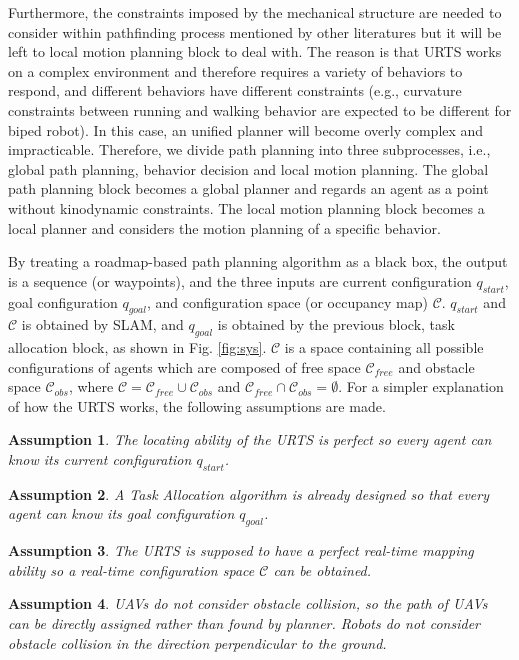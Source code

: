 \documentclass[journal,12pt,onecolumn,draftclsnofoot,]{IEEEtran}
\newtheorem{assumption}{Assumption}[section]
\begin{document}
Furthermore, the constraints imposed by the mechanical structure are needed to consider within pathfinding process mentioned by other literatures but it will be left to local motion planning block to deal with. The reason is that URTS works on a complex environment and therefore requires a variety of behaviors to respond, and different behaviors have different constraints (e.g., curvature constraints between running and walking behavior are expected to be different for biped robot). In this case, an unified planner will become overly complex and impracticable. Therefore, we divide path planning into three subprocesses, i.e., global path planning, behavior decision and local motion planning. The global path planning block becomes a global planner and regards an agent as a point without kinodynamic constraints. The local motion planning block becomes a local planner and considers the motion planning of a specific behavior.

By treating a roadmap-based path planning algorithm as a black box, the output is a sequence (or waypoints), and the three inputs are current configuration $q_{start}$, goal configuration $q_{goal}$, and configuration space (or occupancy map) $\mathcal{C}$. $q_{start}$ and $\mathcal{C}$ is obtained by SLAM, and $q_{goal}$ is obtained by the previous block, task allocation block, as shown in Fig. \ref{fig:sys}. $\mathcal{C}$ is a space containing all possible configurations of agents which are composed of free space $\mathcal{C}_{free}$ and obstacle space $\mathcal{C}_{obs}$, where $\mathcal{C}=\mathcal{C}_{free}\cup\mathcal{C}_{obs}$ and $\mathcal{C}_{free}\cap\mathcal{C}_{obs}=\emptyset$. For a simpler explanation of how the URTS works, the following assumptions are made.

\begin{assumption}
    The locating ability of the URTS is perfect so every agent can know its current configuration $q_{start}$.
\end{assumption}
\begin{assumption}
    A Task Allocation algorithm is already designed so that every agent can know its goal configuration $q_{goal}$.
\end{assumption}
\begin{assumption}
    The URTS is supposed to have a perfect real-time mapping ability so a real-time configuration space $\mathcal{C}$ can be obtained.
\end{assumption}
\begin{assumption} \label{asm:collision} %
    UAVs do not consider obstacle collision, so the path of UAVs can be directly assigned rather than found by planner. Robots do not consider obstacle collision in the direction perpendicular to the ground. 
\end{assumption}
\end{document}
